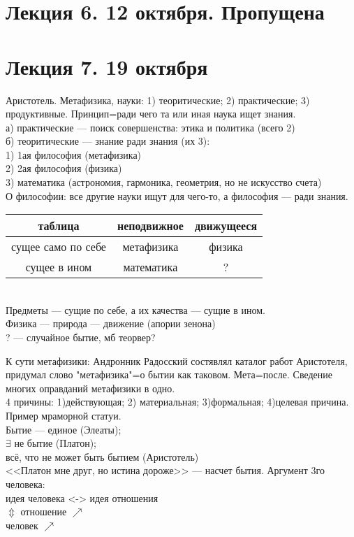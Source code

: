 \documentclass[a4paper,12pt]{article}
\begin{document}
\section{Лекция 6. 12 октября. Пропущена}
\section{Лекция 7. 19 октября}
Аристотель. Метафизика, науки: 1) теоритические; 2) практические; 3) продуктивные. Принцип=ради чего та или иная наука ищет знания.\\
а) практические --- поиск совершенства: этика и политика (всего 2)\\
б) теоритические --- знание ради знания (их 3):\\
1) 1ая философия (метафизика)\\
2) 2ая философия (физика)\\
3) математика (астрономия, гармоника, геометрия, но не искусство счета)\\
О философии: все другие науки ищут для чего-то, а философия --- ради знания.\\
\begin{tabular}{|c|c|c|}\hline
таблица &неподвижное &движущееся\\ \hline
сущее само по себе & метафизика & физика \\ \hline
сущее в ином & математика & ? \\ \hline
\end{tabular}\\
Предметы --- сущие по себе, а их качества --- сущие в ином.\\
Физика --- природа --- движение (апории зенона)\\
? --- случайное бытие, мб теорвер?

К сути метафизики: Андронник Радосский состявлял каталог работ Аристотеля, придумал слово "метафизика"=о бытии как таковом. Мета=после. Сведение многих оправданий метафизики в одно.\\
4 причины: 1)действующая; 2) материальная; 3)формальная; 4)целевая причина. Пример мраморной статуи.\\
Бытие --- единое (Элеаты);\\
$\exists$ не бытие (Платон);\\
всё, что не может быть бытием (Аристотель)\\
<<Платон мне друг, но истина дороже>> --- насчет бытия. Аргумент 3го человека:\\
идея человека <-> идея отношения \\
$\Updownarrow$ отношение $\nearrow$ \\
человек $\nearrow$
\end{document}
